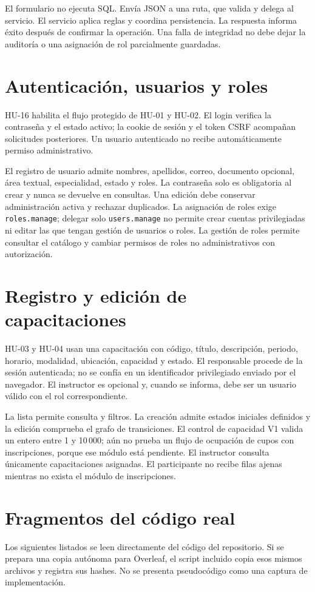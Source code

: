 El formulario no ejecuta SQL. Envía JSON a una ruta, que valida y delega al servicio. El servicio aplica reglas y coordina persistencia. La respuesta informa éxito después de confirmar la operación. Una falla de integridad no debe dejar la auditoría o una asignación de rol parcialmente guardadas.

\section{Autenticación, usuarios y roles}
HU-16 habilita el flujo protegido de HU-01 y HU-02. El login verifica la contraseña y el estado activo; la cookie de sesión y el token CSRF acompañan solicitudes posteriores. Un usuario autenticado no recibe automáticamente permiso administrativo.

El registro de usuario admite nombres, apellidos, correo, documento opcional, área textual, especialidad, estado y roles. La contraseña solo es obligatoria al crear y nunca se devuelve en consultas. Una edición debe conservar administración activa y rechazar duplicados. La asignación de roles exige \texttt{roles.manage}; delegar solo \texttt{users.manage} no permite crear cuentas privilegiadas ni editar las que tengan gestión de usuarios o roles. La gestión de roles permite consultar el catálogo y cambiar permisos de roles no administrativos con autorización.

\section{Registro y edición de capacitaciones}
HU-03 y HU-04 usan una capacitación con código, título, descripción, periodo, horario, modalidad, ubicación, capacidad y estado. El responsable procede de la sesión autenticada; no se confía en un identificador privilegiado enviado por el navegador. El instructor es opcional y, cuando se informa, debe ser un usuario válido con el rol correspondiente.

La lista permite consulta y filtros. La creación admite estados iniciales definidos y la edición comprueba el grafo de transiciones. El control de capacidad V1 valida un entero entre 1 y 10\,000; aún no prueba un flujo de ocupación de cupos con inscripciones, porque ese módulo está pendiente. El instructor consulta únicamente capacitaciones asignadas. El participante no recibe filas ajenas mientras no exista el módulo de inscripciones.

\section{Fragmentos del código real}
Los siguientes listados se leen directamente del código del repositorio. Si se prepara una copia autónoma para Overleaf, el script incluido copia esos mismos archivos y registra sus hashes. No se presenta pseudocódigo como una captura de implementación.

